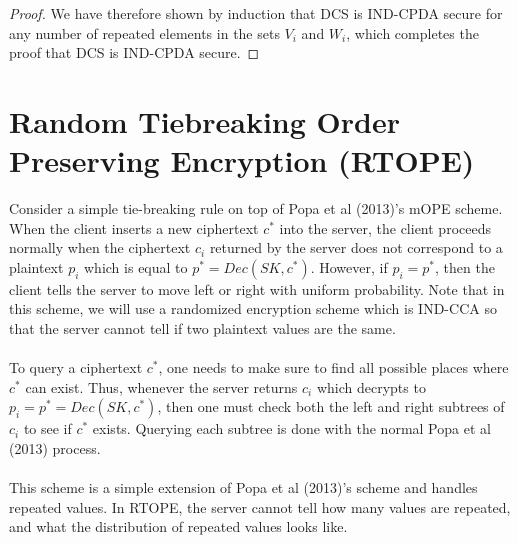 \documentclass[12pt]{article}
\begin{document}
\begin{proof}
We have therefore shown by induction that DCS is IND-CPDA secure for any number of repeated elements in the sets $V_i$ and $W_i$, which completes the proof that DCS is IND-CPDA secure.
\end{proof}
\section{Random Tiebreaking Order Preserving Encryption (RTOPE)}
Consider a simple tie-breaking rule on top of Popa et al (2013)'s mOPE scheme. When the client inserts a new ciphertext $c^*$ into the server, the client proceeds normally when the ciphertext $c_i$ returned by the server does not correspond to a plaintext $p_i$ which is equal to $p^* = Dec(SK, c^*)$. However, if $p_i = p^*$, then the client tells the server to move left or right with uniform probability. Note that in this scheme, we will use a randomized encryption scheme which is IND-CCA so that the server cannot tell if two plaintext values are the same. \\ \\
To query a ciphertext $c^*$, one needs to make sure to find all possible places where $c^*$ can exist. Thus, whenever the server returns $c_i$ which decrypts to $p_i = p^* = Dec(SK, c^*)$, then one must check both the left and right subtrees of $c_i$ to see if $c^*$ exists. Querying each subtree is done with the  normal Popa et al (2013) process. \\ \\
This scheme is a simple extension of Popa et al (2013)'s scheme and handles repeated values. In RTOPE, the server cannot tell how many values are repeated, and what the distribution of repeated values looks like.
\end{document}
